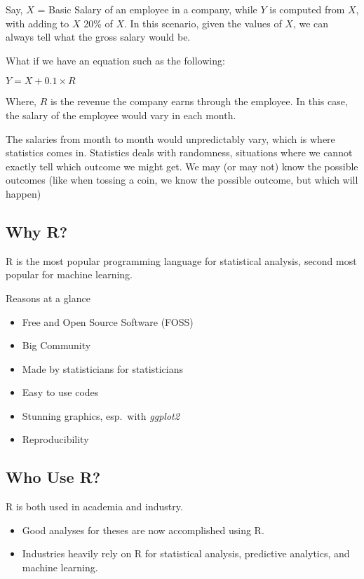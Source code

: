 \documentclass[
]{book}
\providecommand{\tightlist}{%
  \setlength{\itemsep}{0pt}\setlength{\parskip}{0pt}}
\begin{document}
Say, \(X\) = Basic Salary of an employee in a company, while \(Y\) is computed from \(X\), with adding to \(X\) 20\% of \(X\). In this scenario, given the values of \(X\), we can always tell what the gross salary would be.

What if we have an equation such as the following:

\(Y = X + 0.1 \times R\)

Where, \(R\) is the revenue the company earns through the employee. In this case, the salary of the employee would vary in each month.

The salaries from month to month would unpredictably vary, which is where statistics comes in. Statistics deals with randomness, situations where we cannot exactly tell which outcome we might get. We may (or may not) know the possible outcomes (like when tossing a coin, we know the possible outcome, but which will happen)

\hypertarget{why-r}{%
\subsection{Why R?}\label{why-r}}

R is the most popular programming language for statistical analysis, second most popular for machine learning.

Reasons at a glance

\begin{itemize}
\tightlist
\item
  Free and Open Source Software (FOSS)
\item
  Big Community
\item
  Made by statisticians for statisticians
\item
  Easy to use codes
\item
  Stunning graphics, esp.~with \emph{ggplot2}
\item
  Reproducibility
\end{itemize}

\hypertarget{who-use-r}{%
\subsection{Who Use R?}\label{who-use-r}}

R is both used in academia and industry.

\begin{itemize}
\tightlist
\item
  Good analyses for theses are now accomplished using R.
\item
  Industries heavily rely on R for statistical analysis, predictive analytics, and machine learning.
\end{itemize}
\end{document}
